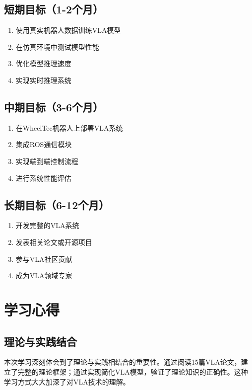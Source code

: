 \documentclass[12pt,a4paper]{article}
\begin{document}
\subsection{短期目标（1-2个月）}

\begin{enumerate}
    \item 使用真实机器人数据训练VLA模型
    \item 在仿真环境中测试模型性能
    \item 优化模型推理速度
    \item 实现实时推理系统
\end{enumerate}

\subsection{中期目标（3-6个月）}

\begin{enumerate}
    \item 在WheelTec机器人上部署VLA系统
    \item 集成ROS通信模块
    \item 实现端到端控制流程
    \item 进行系统性能评估
\end{enumerate}

\subsection{长期目标（6-12个月）}

\begin{enumerate}
    \item 开发完整的VLA系统
    \item 发表相关论文或开源项目
    \item 参与VLA社区贡献
    \item 成为VLA领域专家
\end{enumerate}

\section{学习心得}

\subsection{理论与实践结合}

本次学习深刻体会到了理论与实践相结合的重要性。通过阅读15篇VLA论文，建立了完整的理论框架；通过实现简化VLA模型，验证了理论知识的正确性。这种学习方式大大加深了对VLA技术的理解。
\end{document}
